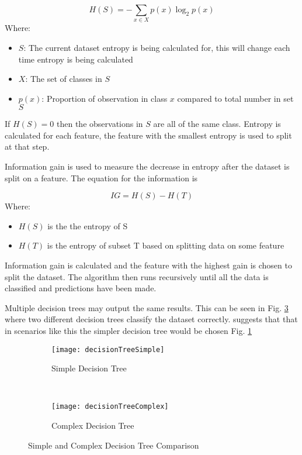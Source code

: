 \begin{equation} \label{eq:entropy}
H(S) = - \sum_{x \in X} p(x) \log_{2} p(x)
\end{equation}
Where:
\begin{itemize}[label=]
	\item $S$: The current dataset entropy is being calculated for, this will change each time entropy is being calculated
	\item $X$: The set of classes in $S$
	\item $p(x)$: Proportion of observation in class $x$ compared to total number in set $S$
\end{itemize}
If $H(S) = 0$ then the observations in $S$ are all of the same class. Entropy is calculated for each feature, the feature with the smallest entropy is used to split at that step.

Information gain is used to measure the decrease in entropy after the dataset is split on a feature. The equation for the information is 

\begin{equation} \label{eq:infoGain}
IG = H(S) -  H(T)
\end{equation}
Where:
\begin{itemize}[label=]
	\item $H(S)$ is the the entropy of S
	\item $H(T)$ is the entropy of subset T based on splitting data on some feature
\end{itemize}

Information gain is calculated and the feature with the highest gain is chosen to split the dataset. The algorithm then runs recursively until all the data is classified and predictions have been made. 

Multiple decision trees may output the same results. This can be seen in Fig. \ref{fig:simpleComplex} where two different decision trees classify the dataset correctly. \cite{quinlan_induction_1986} suggests that that in scenarios like this the simpler decision tree would be chosen Fig. \ref{fig:simple}

\begin{figure}[H]
	\centering
	\begin{subfigure}[b]{0.45\textwidth}
		\captionsetup{font=scriptsize}
		\texttt{[image: decisionTreeSimple]}
		\caption{Simple Decision Tree}\label{fig:decisionTreeSimple}
		\label{fig:simple}
	\end{subfigure} ~\quad
	\begin{subfigure}[b]{0.45\textwidth}
		\captionsetup{font=scriptsize}
		\texttt{[image: decisionTreeComplex]}
		\caption{Complex Decision Tree}\label{fig:decisionTreeComplex}
		\label{fig:complex}
	\end{subfigure}
	\caption{Simple and Complex Decision Tree Comparison\\\cite[Source:][]{quinlan_induction_1986}}
	\label{fig:simpleComplex}
\end{figure}

